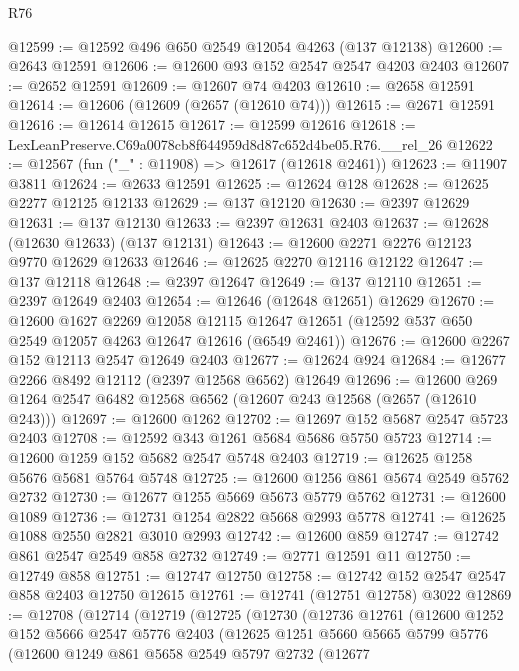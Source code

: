 \begin{lexlean}{R76}
\begin{coremodule}
@12599 := @12592 @496 @650 @2549 @12054 @4263 (@137 @12138)
@12600 := @2643 @12591
@12606 := @12600 @93 @152 @2547 @2547 @4203 @2403
@12607 := @2652 @12591
@12609 := @12607 @74 @4203
@12610 := @2658 @12591
@12614 := @12606 (@12609 (@2657 (@12610 @74)))
@12615 := @2671 @12591
@12616 := @12614 @12615
@12617 := @12599 @12616
@12618 := LexLeanPreserve.C69a0078cb8f644959d8d87c652d4be05.R76.__rel_26
@12622 := @12567 (fun ("_" : @11908) => @12617 (@12618 @2461))
@12623 := @11907 @3811
@12624 := @2633 @12591
@12625 := @12624 @128
@12628 := @12625 @2277 @12125 @12133
@12629 := @137 @12120
@12630 := @2397 @12629
@12631 := @137 @12130
@12633 := @2397 @12631 @2403
@12637 := @12628 (@12630 @12633) (@137 @12131)
@12643 := @12600 @2271 @2276 @12123 @9770 @12629 @12633
@12646 := @12625 @2270 @12116 @12122
@12647 := @137 @12118
@12648 := @2397 @12647
@12649 := @137 @12110
@12651 := @2397 @12649 @2403
@12654 := @12646 (@12648 @12651) @12629
@12670 := @12600
    @1627
    @2269
    @12058
    @12115
    @12647
    @12651
    (@12592 @537 @650 @2549 @12057 @4263 @12647 @12616 (@6549 @2461))
@12676 := @12600 @2267 @152 @12113 @2547 @12649 @2403
@12677 := @12624 @924
@12684 := @12677 @2266 @8492 @12112 (@2397 @12568 @6562) @12649
@12696 := @12600 @269 @1264 @2547 @6482 @12568 @6562 (@12607 @243 @12568 (@2657 (@12610 @243)))
@12697 := @12600 @1262
@12702 := @12697 @152 @5687 @2547 @5723 @2403
@12708 := @12592 @343 @1261 @5684 @5686 @5750 @5723
@12714 := @12600 @1259 @152 @5682 @2547 @5748 @2403
@12719 := @12625 @1258 @5676 @5681 @5764 @5748
@12725 := @12600 @1256 @861 @5674 @2549 @5762 @2732
@12730 := @12677 @1255 @5669 @5673 @5779 @5762
@12731 := @12600 @1089
@12736 := @12731 @1254 @2822 @5668 @2993 @5778
@12741 := @12625 @1088 @2550 @2821 @3010 @2993
@12742 := @12600 @859
@12747 := @12742 @861 @2547 @2549 @858 @2732
@12749 := @2771 @12591 @11
@12750 := @12749 @858
@12751 := @12747 @12750
@12758 := @12742 @152 @2547 @2547 @858 @2403 @12750 @12615
@12761 := @12741 (@12751 @12758) @3022
@12869 := @12708
    (@12714
      (@12719
        (@12725
          (@12730
            (@12736
              @12761
              (@12600
                @1252
                @152
                @5666
                @2547
                @5776
                @2403
                (@12625
                  @1251
                  @5660
                  @5665
                  @5799
                  @5776
                  (@12600
                    @1249
                    @861
                    @5658
                    @2549
                    @5797
                    @2732
                    (@12677

\end{coremodule}
\end{lexlean}
